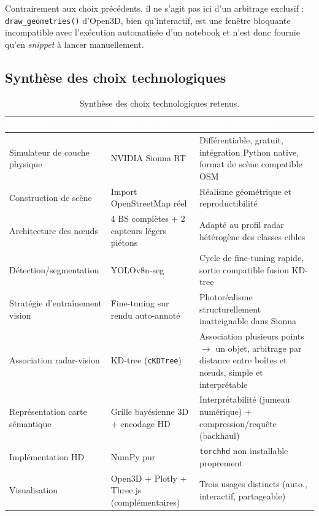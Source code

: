 \documentclass[12pt,a4paper,titlepage]{article}
\newcommand{\hd}[1]{\textcolor{white}{\textbf{#1}}}
\begin{document}
Contrairement aux choix précédents, il ne s'agit pas ici d'un arbitrage exclusif : \texttt{draw\_geometries()} d'Open3D, bien qu'interactif, est une fenêtre bloquante incompatible avec l'exécution automatisée d'un notebook et n'est donc fournie qu'en \textit{snippet} à lancer manuellement.

\subsection{Synthèse des choix technologiques}

\begin{table}[H]
    \centering
    \caption{Synthèse des choix technologiques retenus.}
    \begin{tabularx}{\textwidth}{F{3.8cm}LL}
        \toprule
        \hd{Décision} & \hd{Choix retenu} & \hd{Raison principale} \\
        \midrule
        Simulateur de couche physique & NVIDIA Sionna RT & Différentiable, gratuit, intégration Python native, format de scène compatible OSM \\
        Construction de scène & Import OpenStreetMap réel & Réalisme géométrique et reproductibilité \\
        Architecture des n\oe uds & 4 BS complètes + 2 capteurs légers piétons & Adapté au profil radar hétérogène des classes cibles \\
        Détection\slash segmentation & YOLOv8n-seg & Cycle de fine-tuning rapide, sortie compatible fusion KD-tree \\
        Stratégie d'entraînement vision & Fine-tuning sur rendu auto-annoté & Photoréalisme structurellement inatteignable dans Sionna \\
        Association radar-vision & KD-tree (\texttt{cKDTree}) & Association plusieurs points $\to$ un objet, arbitrage par distance entre boîtes et n\oe uds, simple et interprétable \\
        Représentation carte sémantique & Grille bayésienne 3D + encodage HD & Interprétabilité (jumeau numérique) + compression/requête (backhaul) \\
        Implémentation HD & NumPy pur & \texttt{torchhd} non installable proprement \\
        Visualisation & Open3D + Plotly + Three.js (complémentaires) & Trois usages distincts (auto., interactif, partageable) \\
        \bottomrule
    \end{tabularx}
\end{table}
\end{document}
